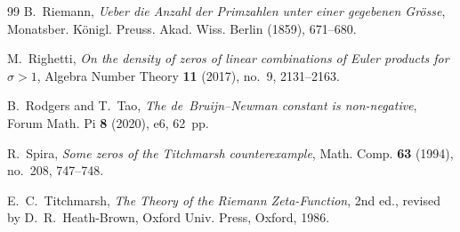 \documentclass[11pt,a4paper,reqno]{amsart}
\theoremstyle{definition}
\theoremstyle{remark}
\numberwithin{equation}{section}
\begin{document}
\begin{thebibliography}{99}
B.~Riemann, \emph{Ueber die Anzahl der Primzahlen unter einer gegebenen Gr\"osse}, Monatsber. K\"onigl. Preuss. Akad. Wiss. Berlin (1859), 671--680.

M.~Righetti, \emph{On the density of zeros of linear combinations of Euler products for $\sigma > 1$}, Algebra Number Theory \textbf{11} (2017), no.~9, 2131--2163.

B.~Rodgers and T.~Tao, \emph{The de~Bruijn--Newman constant is non-negative}, Forum Math. Pi \textbf{8} (2020), e6, 62~pp.

R.~Spira, \emph{Some zeros of the Titchmarsh counterexample}, Math. Comp. \textbf{63} (1994), no.~208, 747--748.

E.~C.~Titchmarsh, \emph{The Theory of the Riemann Zeta-Function}, 2nd ed., revised by D.~R.~Heath-Brown, Oxford Univ. Press, Oxford, 1986.

\end{thebibliography}
\end{document}
